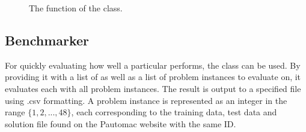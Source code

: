 \begin{figure}
\caption{The  function of the  class.}
\label{code:learner}
\end{figure}

\subsection{Benchmarker}
For quickly evaluating how well a particular  performs, the  class can be used. By providing it with a list of  as well as a list of problem instances to evaluate on, it evaluates each  with all problem instances. The result is output to a specified file using .csv formatting. A problem instance is represented as an integer in the range $\{1, 2, ..., 48\}$, each corresponding to the training data, test data and solution file found on the Pautomac website with the same ID.
